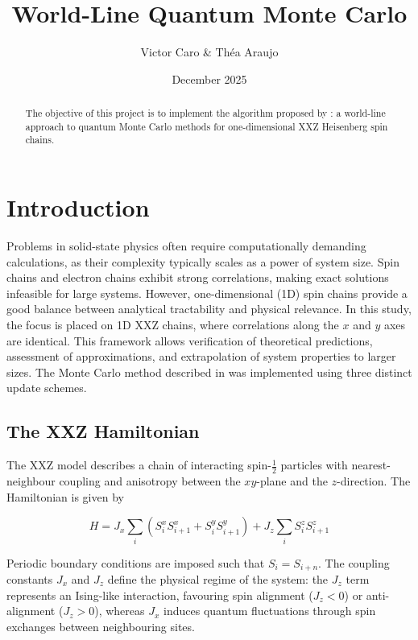 \documentclass[a4paper]{article}
\title{World-Line Quantum Monte Carlo}
\author{Victor Caro \& Théa Araujo}
\date{December 2025}
\begin{document}
\maketitle

\begin{abstract}
    The objective of this project is to implement the algorithm proposed by \textcite{Assaad2008}: a world-line approach to quantum Monte Carlo methods for one-dimensional XXZ Heisenberg spin chains.
\end{abstract}

\tableofcontents

\section{Introduction}

Problems in solid-state physics often require computationally demanding calculations, as their complexity typically scales as a power of system size. Spin chains and electron chains exhibit strong correlations, making exact solutions infeasible for large systems. However, one-dimensional (1D) spin chains provide a good balance between analytical tractability and physical relevance. In this study, the focus is placed on 1D XXZ chains, where correlations along the $x$ and $y$ axes are identical. This framework allows verification of theoretical predictions, assessment of approximations, and extrapolation of system properties to larger sizes. The Monte Carlo method described in \cite{Assaad2008} was implemented using three distinct update schemes.

\subsection{The XXZ Hamiltonian}

The XXZ model describes a chain of interacting spin-$\frac{1}{2}$ particles with nearest-neighbour coupling and anisotropy between the $xy$-plane and the $z$-direction. The Hamiltonian is given by

\begin{equation}
    H = J_{x}\sum_{i}(S_{i}^{x}S_{i+1}^{x} + S_{i}^{y}S_{i+1}^{y}) + J_{z}\sum_{i}S_{i}^{z}S_{i+1}^{z}
\end{equation}

Periodic boundary conditions are imposed such that $S_i = S_{i+n}$. The coupling constants $J_x$ and $J_z$ define the physical regime of the system: the $J_z$ term represents an Ising-like interaction, favouring spin alignment ($J_z<0$) or anti-alignment ($J_z>0$), whereas $J_x$ induces quantum fluctuations through spin exchanges between neighbouring sites.
\end{document}
